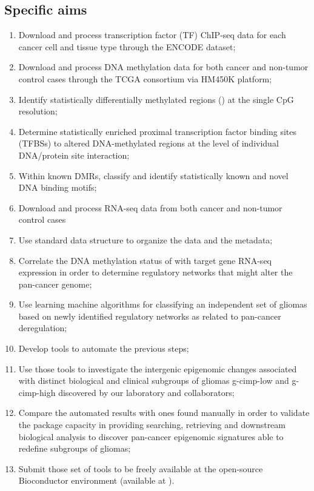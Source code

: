\subsection{ Specific aims}
\begin{enumerate}
    \item Download and process transcription factor (TF) ChIP-seq data for each cancer cell and tissue type through the ENCODE dataset;
    \item Download and process DNA methylation data for both cancer and non-tumor control cases through the TCGA consortium via HM450K platform;
    \item Identify statistically differentially methylated regions () at the single CpG resolution;
    \item Determine statistically enriched proximal transcription factor binding sites (TFBSs) to altered DNA-methylated regions at the level of individual DNA/protein site interaction; 
    \item Within known DMRs, classify and identify statistically known and novel DNA binding motifs;
    \item Download and process RNA-seq data from both cancer and non-tumor control cases
    \item Use standard data structure to organize the data and the metadata; 
    \item Correlate the DNA methylation status of  with target gene RNA-seq expression in order to determine regulatory networks that might alter the pan-cancer genome;
    \item Use learning machine algorithms for classifying an independent set of gliomas based on newly identified regulatory networks as related to pan-cancer deregulation;
    \item Develop tools to automate the previous steps;
    \item Use those tools to investigate the intergenic epigenomic changes associated with distinct biological and clinical subgroups of gliomas g-cimp-low and g-cimp-high discovered by our laboratory and collaborators;
    \item Compare the automated results with ones found manually in order to validate the package capacity in providing searching, retrieving and downstream biological analysis to discover pan-cancer epigenomic signatures able to redefine subgroups of gliomas; 
    \item Submit those set of tools to be freely available at the open-source Bioconductor environment (available at ).
\end{enumerate}

